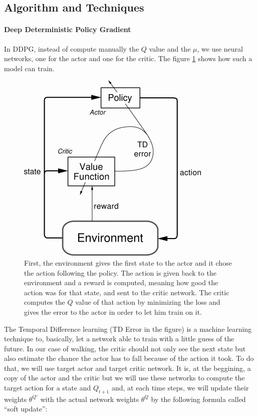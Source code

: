 \documentclass{article}
\begin{document}
\subsection{Algorithm and Techniques}

\paragraph{Deep Deterministic Policy Gradient}

In DDPG, instead of compute manually the $Q$ value and the $\mu$, we
use neural networks, one for the actor and one for the critic. The figure
\ref{fig:actor-critic} shows how such a model can train.

\begin{figure}[ht]
  \centering
  \includegraphics[width=.5\textwidth]{actor-critic}
  \caption{First, the environment gives the first state to the actor and it chose the
action following the policy. The action is given back to the environment and a
reward is computed, meaning how good the action was for that state, and sent to
the critic network. The critic computes the $Q$ value of that action by
minimizing the loss and gives the error to the actor in order to let him train
on it.}
  \label{fig:actor-critic}
\end{figure}

The Temporal Difference learning (TD Error in the figure) is a machine learning
technique to, basically, let a network able to train with a little guess of the
future. In our case of walking, the critic should not only see the next state
but also estimate the chance the actor has to fall because of the action it
took. To do that, we will use target actor and target critic network. It is, at
the beggining, a copy of the actor and the critic but we will use these networks
to compute the target action for a state and $Q_{t+1}$ and, at each time steps,
we will update their weights $\theta^{Q'}$ with the actual network weights
$\theta^Q$ by the following formula called ``soft update'':  
\end{document}
